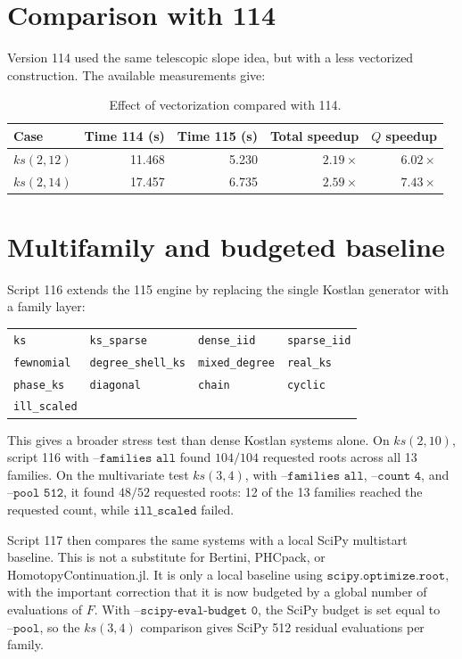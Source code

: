 \documentclass[11pt,a4paper]{article}
\begin{document}
\section{Comparison with 114}
Version 114 used the same telescopic slope idea, but with a less vectorized construction. The available measurements give:
\begin{table}[h]
\centering
\begin{tabular}{lrrrr}
\toprule
Case & Time 114 (s) & Time 115 (s) & Total speedup & \(Q\) speedup\\
\midrule
\(ks(2,12)\) & 11.468 & 5.230 & \(2.19\times\) & \(6.02\times\)\\
\(ks(2,14)\) & 17.457 & 6.735 & \(2.59\times\) & \(7.43\times\)\\
\bottomrule
\end{tabular}
\caption{Effect of vectorization compared with 114.}
\label{tab:115-vs114}
\end{table}

\section{Multifamily and budgeted baseline}
Script 116 extends the 115 engine by replacing the single Kostlan generator with a family layer:
\begin{center}
\small
\begin{tabular}{llll}
\texttt{ks} & \texttt{ks\_sparse} & \texttt{dense\_iid} & \texttt{sparse\_iid}\\
\texttt{fewnomial} & \texttt{degree\_shell\_ks} & \texttt{mixed\_degree} & \texttt{real\_ks}\\
\texttt{phase\_ks} & \texttt{diagonal} & \texttt{chain} & \texttt{cyclic}\\
\texttt{ill\_scaled} & & &
\end{tabular}
\end{center}
This gives a broader stress test than dense Kostlan systems alone. On \(ks(2,10)\), script 116 with \(\texttt{--families all}\) found \(104/104\) requested roots across all 13 families. On the multivariate test \(ks(3,4)\), with \(\texttt{--families all}\), \(\texttt{--count 4}\), and \(\texttt{--pool 512}\), it found \(48/52\) requested roots: 12 of the 13 families reached the requested count, while \(\texttt{ill\_scaled}\) failed.

Script 117 then compares the same systems with a local SciPy multistart baseline. This is not a substitute for Bertini, PHCpack, or HomotopyContinuation.jl. It is only a local baseline using \(\texttt{scipy.optimize.root}\), with the important correction that it is now budgeted by a global number of evaluations of \(F\). With \(\texttt{--scipy-eval-budget 0}\), the SciPy budget is set equal to \(\texttt{--pool}\), so the \(ks(3,4)\) comparison gives SciPy 512 residual evaluations per family.
\end{document}
